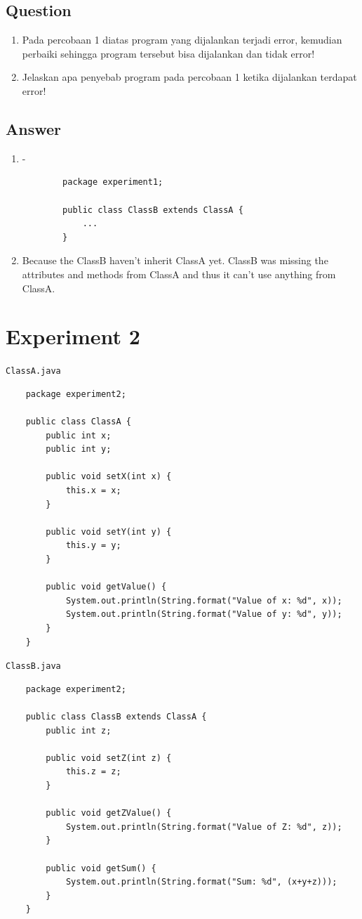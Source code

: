 \documentclass[12pt,titlepage]{article}
\begin{document}
\subsection{Question}
\begin{enumerate}
    \item Pada percobaan 1 diatas program yang dijalankan terjadi error, kemudian perbaiki sehingga program tersebut bisa dijalankan dan tidak error!
    \item Jelaskan apa penyebab program pada percobaan 1 ketika dijalankan terdapat error!
\end{enumerate}

\subsection{Answer}
\begin{enumerate}
    \item -
    \begin{verbatim}
        package experiment1;
    
        public class ClassB extends ClassA {
            ...
        }
    \end{verbatim}
    \item Because the ClassB haven't inherit ClassA yet. ClassB was missing the attributes and methods from ClassA and thus it can't use anything from ClassA.
\end{enumerate}

\newpage

\section{Experiment 2}
\texttt{ClassA.java}
\begin{verbatim}
    package experiment2;

    public class ClassA {
        public int x;
        public int y;

        public void setX(int x) {
            this.x = x;
        }

        public void setY(int y) {
            this.y = y;
        }

        public void getValue() {
            System.out.println(String.format("Value of x: %d", x));
            System.out.println(String.format("Value of y: %d", y));
        }
    }
\end{verbatim}
\texttt{ClassB.java}
\begin{verbatim}
    package experiment2;

    public class ClassB extends ClassA {
        public int z;

        public void setZ(int z) {
            this.z = z;
        }

        public void getZValue() {
            System.out.println(String.format("Value of Z: %d", z));
        }

        public void getSum() {
            System.out.println(String.format("Sum: %d", (x+y+z)));
        }
    }
\end{verbatim}
\end{document}
